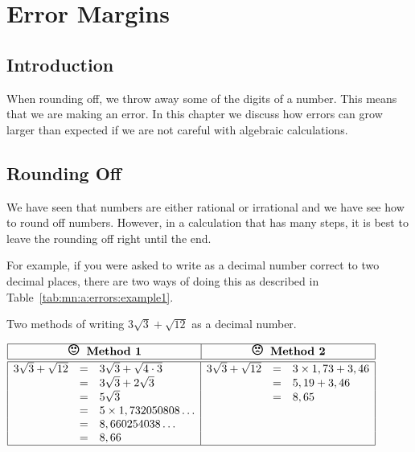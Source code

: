\chapter{Error Margins}
\label{m:ng11}

\section{Introduction}
When rounding off, we throw away some of the digits of a number. This
means that we are making an error. In this chapter we discuss how
errors can grow larger than expected if we are not careful with
algebraic calculations.



\section{Rounding Off}
We have seen that numbers are either rational or irrational and we have see how to round off numbers. However, in a calculation that has many steps, it is best to leave the rounding off right until the end.

For example, if you were asked to write
as a decimal number correct to two decimal places, there are two ways of doing this as described in Table~\ref{tab:mn:a:errors:example1}.

\begin{table}[htbp]
\begin{center}
\caption{Two methods of writing $3\sqrt{3}+\sqrt{12}$ as a decimal number.}
\label{tab:mn:a:errors:example1}
$\begin{array}{|rcl|rcl|}\hline
\multicolumn{3}{|c}{\textbf{\Large{\smiley} \normalsize Method 1}}& \multicolumn{3}{|c|}{\textbf{\Large{\frownie} \normalsize Method 2}}\\\hline\hline
3\sqrt{3}+\sqrt{12}&=&3\sqrt{3}+\sqrt{4\cdot 3} &3\sqrt{3}+\sqrt{12}&=&3 \times 1,73+3,46\\
&=&3\sqrt{3}+2\sqrt{3} &&=&5,19+3,46\\
&=&5\sqrt{3} &&=&8,65\\
&=&5 \times 1,732050808\ldots &&&\\
&=&8,660254038\ldots &&&\\
&=&8,66 &&&\\\hline
\end{array}$
\end{center}
\end{table}

